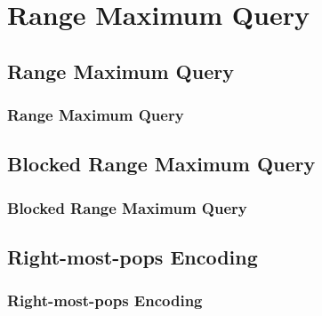 \section{Range Maximum Query}

\subsection{Range Maximum Query}
\begin{frame}
    \frametitle{Range Maximum Query}
\end{frame}

\subsection{Blocked Range Maximum Query}
\begin{frame}
    \frametitle{Blocked Range Maximum Query}
\end{frame}

\subsection{Right-most-pops Encoding}
\begin{frame}
    \frametitle{Right-most-pops Encoding}
\end{frame}